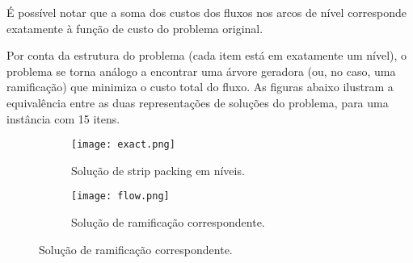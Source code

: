 \documentclass{article}
\begin{document}
É possível notar que a soma dos custos dos fluxos nos arcos de nível corresponde exatamente à função de custo do problema original.

Por conta da estrutura do problema (cada item está em exatamente um nível), o problema se torna análogo a encontrar uma árvore geradora (ou, no caso, uma ramificação) que minimiza o custo total do fluxo. As figuras abaixo ilustram a equivalência entre as duas representações de soluções do problema, para uma instância com 15 itens.
\begin{figure}[h]
    \centering
    \begin{subfigure}{.5\textwidth}
        \centering
        \texttt{[image: exact.png]}
        \caption{Solução de strip packing em níveis.}
    \end{subfigure}%
    \begin{subfigure}{.5\textwidth}
        \centering
        \texttt{[image: flow.png]}
        \caption{Solução de ramificação correspondente.}
    \end{subfigure}
\end{figure}
\end{document}
